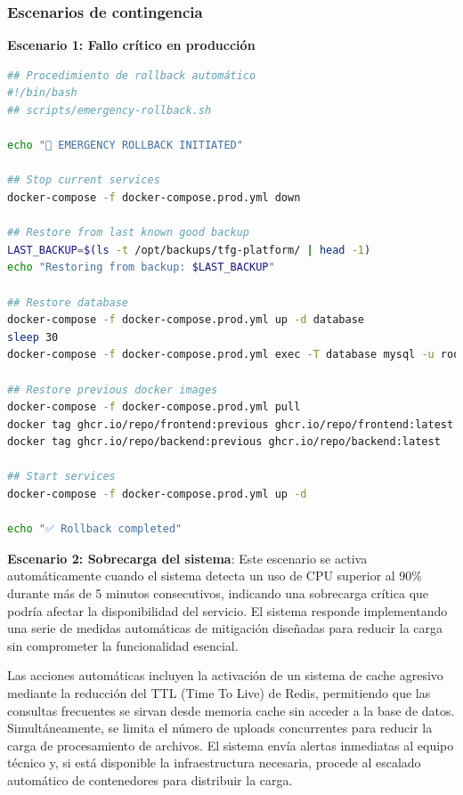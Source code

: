 \documentclass[12pt,a4paper,oneside]{report}
\begin{document}
\subsubsection{Escenarios de
contingencia}\label{escenarios-de-contingencia}

\textbf{Escenario 1: Fallo crítico en producción}

\begin{lstlisting}[language=bash]
## Procedimiento de rollback automático
#!/bin/bash
## scripts/emergency-rollback.sh

echo "🚨 EMERGENCY ROLLBACK INITIATED"

## Stop current services
docker-compose -f docker-compose.prod.yml down

## Restore from last known good backup
LAST_BACKUP=$(ls -t /opt/backups/tfg-platform/ | head -1)
echo "Restoring from backup: $LAST_BACKUP"

## Restore database
docker-compose -f docker-compose.prod.yml up -d database
sleep 30
docker-compose -f docker-compose.prod.yml exec -T database mysql -u root -p$DB_ROOT_PASSWORD tfg_production < /opt/backups/tfg-platform/$LAST_BACKUP/database.sql

## Restore previous docker images
docker-compose -f docker-compose.prod.yml pull
docker tag ghcr.io/repo/frontend:previous ghcr.io/repo/frontend:latest
docker tag ghcr.io/repo/backend:previous ghcr.io/repo/backend:latest

## Start services
docker-compose -f docker-compose.prod.yml up -d

echo "✅ Rollback completed"
\end{lstlisting}

\textbf{Escenario 2: Sobrecarga del sistema}: Este escenario se activa automáticamente cuando el sistema detecta un uso de CPU superior al 90\% durante más de 5 minutos consecutivos, indicando una sobrecarga crítica que podría afectar la disponibilidad del servicio. El sistema responde implementando una serie de medidas automáticas de mitigación diseñadas para reducir la carga sin comprometer la funcionalidad esencial.

Las acciones automáticas incluyen la activación de un sistema de cache agresivo mediante la reducción del TTL (Time To Live) de Redis, permitiendo que las consultas frecuentes se sirvan desde memoria cache sin acceder a la base de datos. Simultáneamente, se limita el número de uploads concurrentes para reducir la carga de procesamiento de archivos. El sistema envía alertas inmediatas al equipo técnico y, si está disponible la infraestructura necesaria, procede al escalado automático de contenedores para distribuir la carga.
\end{document}
